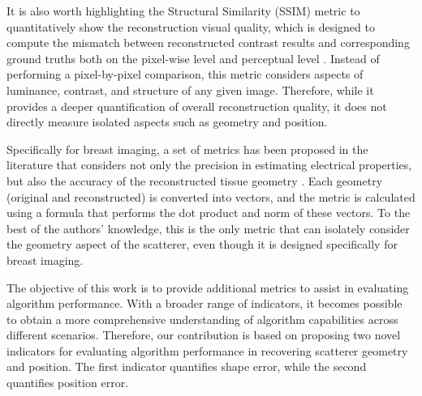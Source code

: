 \documentclass{IEEEtran}
\begin{document}
        It is also worth highlighting the Structural Similarity (SSIM) metric \cite{wang2004image} to quantitatively show the reconstruction visual quality, which is designed to compute the mismatch between reconstructed contrast results and corresponding ground truths both on the pixel-wise level and perceptual level \cite{wang2023push,liu2025exploring}. Instead of performing a pixel-by-pixel comparison, this metric considers aspects of luminance, contrast, and structure of any given image. Therefore, while it provides a deeper quantification of overall reconstruction quality, it does not directly measure isolated aspects such as geometry and position.

        Specifically for breast imaging, a set of metrics has been proposed in the literature that considers not only the precision in estimating electrical properties, but also the accuracy of the reconstructed tissue geometry \cite{kurrant2021evaluating}. Each geometry (original and reconstructed) is converted into vectors, and the metric is calculated using a formula that performs the dot product and norm of these vectors. To the best of the authors' knowledge, this is the only metric that can isolately consider the geometry aspect of the scatterer, even though it is designed specifically for breast imaging.



        The objective of this work is to provide additional metrics to assist in evaluating algorithm performance. With a broader range of indicators, it becomes possible to obtain a more comprehensive understanding of algorithm capabilities across different scenarios. Therefore, our contribution is based on proposing two novel indicators for evaluating algorithm performance in recovering scatterer geometry and position. The first indicator quantifies shape error, while the second quantifies position error. 
\end{document}
